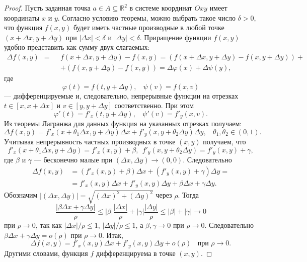 \documentclass[12pt]{report}
\numberwithin{equation}{section}
\begin{document}
\begin{proof}
Пусть заданная точка $a \in A \subseteq \mathbb{R}^2$ в системе координат $Oxy$ имеет координаты $x$ и $y$. Согласно условию теоремы, можно выбрать такое число $\delta > 0$, что функция $f(x,y)$ будет иметь частные производные в любой точке $(x + \Delta x, y + \Delta y)$ при $|\Delta x| < \delta$ и $|\Delta y| < \delta$.  Приращение функции $f(x,y)$ удобно представить как сумму двух слагаемых:
\[ 
\begin{aligned}
\Delta f(x,y)  ~~=~~ &f(x + \Delta x, y + \Delta y) - f(x,y) = (f(x + \Delta x, y + \Delta y) - f(x, y + \Delta y)) +\\
&+(f(x,y + \Delta y) - f(x,y)) = \Delta \varphi(x) + \Delta \psi(y),
\end{aligned}
\]
где
\[ \varphi(t) = f(t, y + \Delta y),~~~~\psi(v) = f(x,v)\]
--- дифференцируемые и, следовательно, непрерывные функции на отрезках $t \in [x, x + \Delta x]$ и $v \in [y, y + \Delta y]$ соответственно. При этом
\[ \varphi'(t) = f'_x(t, y + \Delta y),~~~~\psi'(v) = f'_y(x,v).\]
Из теоремы Лагранжа для данных функция на указанных отрезках получаем:
\[ \Delta f(x,y) = f'_x(x + \theta_1 \Delta x, y + \Delta y)\Delta x + f'_y(x, y + \theta_2 \Delta y) \Delta y,~~~~\theta_1, \theta_2 \in (0,1).\]
Учитывая непрерывность частных производных в точке $(x,y)$ получаем, что
\[ f'_x(x + \theta_1 \Delta x, y + \Delta y) = f'_x(x,y) + \beta,~~f'_y(x, y + \theta_2 \Delta y) = f'_y (x,y) + \gamma, \]
где $\beta$ и $\gamma$ --- бесконечно малые при $(\Delta x, \Delta y) \to (0,0)$. Следовательно
\[ \begin{aligned}
\Delta f(x,y) &= (f'_x(x,y) + \beta)\Delta x + (f'_y(x,y) + \gamma)\Delta y =\\
&= f'_x(x,y)\Delta x + f'_y(x,y)\Delta y + \beta \Delta x + \gamma \Delta y.
\end{aligned}\]
Обозначим $|(\Delta x, \Delta y)| = \sqrt{(\Delta x)^2+(\Delta y)^2}$ через $\rho$. Тогда
\[ \frac{|\beta \Delta x + \gamma \Delta y|}{\rho} \leqslant |\beta| \frac{|\Delta x|}{\rho}  + |\gamma| \frac{|\Delta y|}{\rho} \leqslant |\beta| + |\gamma| \to 0\]
при $\rho \to 0$, так как $|\Delta x | / \rho \leqslant 1$, $|\Delta y| / \rho \leqslant 1$, а $\beta, \gamma \to 0$ при $\rho \to 0$. Следовательно $\beta \Delta x + \gamma \Delta y = o(\rho)$ при $\rho \to 0$. Итак,
\begin{equation}\label{eq:37:3}
\Delta f(x,y) = f'_x (x,y) \Delta x + f'_y (x,y) \Delta y + o(\rho)~~~~\text{при } \rho \to 0.\end{equation} 
Другими словами, функция $f$ дифференцируема в точке $(x,y)$.
\end{proof}
\end{document}
